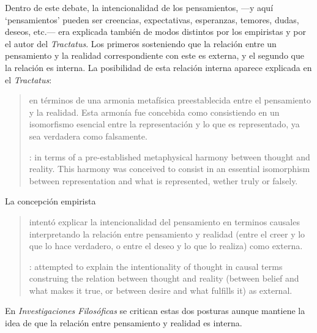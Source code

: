   Dentro de este debate, la intencionalidad de los pensamientos, ---y aquí `pensamientos' pueden ser creencias, expectativas, esperanzas, temores, dudas, deseos, etc.--- era explicada también de modos distintos por los empiristas y por el autor del \emph{Tractatus}. Los primeros sosteniendo que la relación entre un pensamiento y la realidad correspondiente con este es externa, y el segundo que la relación es interna. La posibilidad de esta relación interna aparece explicada en el \emph{Tractatus}: \blockquote[{\cite[3]{hacker2000mind}}: in terms of a pre-established metaphysical harmony between thought and reality. This harmony was conceived to consist in an essential isomorphism between representation and what is represented, wether truly or falsely.]{en términos de una armonia metafísica preestablecida entre el pensamiento y la realidad. Esta armonía fue concebida como consistiendo en un isomorfismo esencial entre la representación y lo que es representado, ya sea verdadera como falsamente.} La concepción empirista \blockquote[{\cite[3]{hacker2000mind}}: attempted to explain the intentionality of thought in causal terms \textelp{} construing the relation between thought and reality (between belief and what makes it true, or between desire and what fulfills it) as external.]{intentó explicar la intencionalidad del pensamiento en terminos causales \textelp{} interpretando la relación entre pensamiento y realidad (entre el creer y lo que lo hace verdadero, o entre el deseo y lo que lo realiza) como externa.} En \emph{Investigaciones Filosóficas} se critican estas dos posturas aunque mantiene la idea de que la relación entre pensamiento y realidad es interna.

